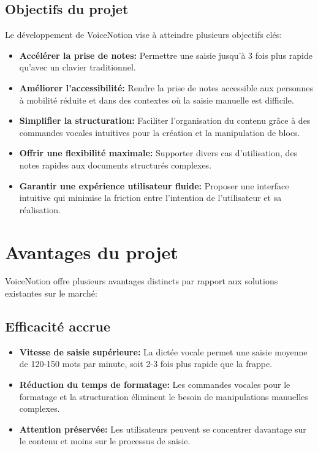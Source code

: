 \subsection{Objectifs du projet}

Le développement de VoiceNotion vise à atteindre plusieurs objectifs clés:

\begin{itemize}
    \item \textbf{Accélérer la prise de notes:} Permettre une saisie jusqu'à 3 fois plus rapide qu'avec un clavier traditionnel.
    
    \item \textbf{Améliorer l'accessibilité:} Rendre la prise de notes accessible aux personnes à mobilité réduite et dans des contextes où la saisie manuelle est difficile.
    
    \item \textbf{Simplifier la structuration:} Faciliter l'organisation du contenu grâce à des commandes vocales intuitives pour la création et la manipulation de blocs.
    
    \item \textbf{Offrir une flexibilité maximale:} Supporter divers cas d'utilisation, des notes rapides aux documents structurés complexes.
    
    \item \textbf{Garantir une expérience utilisateur fluide:} Proposer une interface intuitive qui minimise la friction entre l'intention de l'utilisateur et sa réalisation.
\end{itemize}

\section{Avantages du projet}

VoiceNotion offre plusieurs avantages distincts par rapport aux solutions existantes sur le marché:

\subsection{Efficacité accrue}

\begin{itemize}
    \item \textbf{Vitesse de saisie supérieure:} La dictée vocale permet une saisie moyenne de 120-150 mots par minute, soit 2-3 fois plus rapide que la frappe.
    
    \item \textbf{Réduction du temps de formatage:} Les commandes vocales pour le formatage et la structuration éliminent le besoin de manipulations manuelles complexes.
    
    \item \textbf{Attention préservée:} Les utilisateurs peuvent se concentrer davantage sur le contenu et moins sur le processus de saisie.
\end{itemize}

